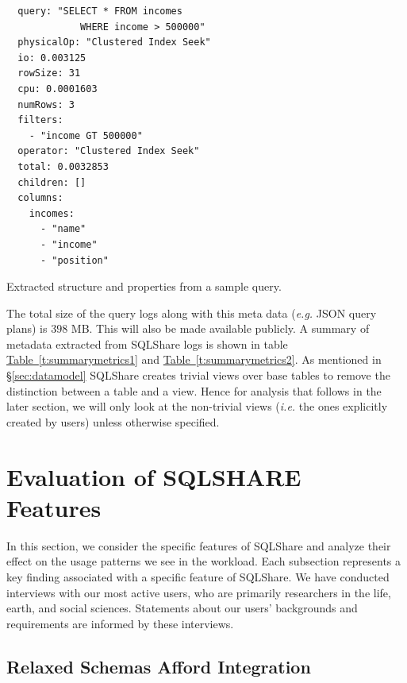 \documentclass{sig-alternate}
\newcommand{\note}[2]{{\color{#1} {#2}}}
\newcommand{\reviewmeta}[1]{\note{black}{#1}}
\newcommand{\ie}{{\em i.e.}\xspace}
\newcommand{\eg}{{\em e.g.}\xspace}
\newcommand{\secref}[1]{\hyperref[#1]{\S\ref*{#1}}}
\newcommand{\tabref}[1]{\hyperref[#1]{Table~\ref*{#1}}}
\newcommand{\sqlshare}{SQLShare}
\newcommand{\SQLSHARE}{SQLSHARE}
\begin{document}
\begin{listing}[h]
\begin{verbatim}
  query: "SELECT * FROM incomes
             WHERE income > 500000"
  physicalOp: "Clustered Index Seek"
  io: 0.003125
  rowSize: 31
  cpu: 0.0001603
  numRows: 3
  filters:
    - "income GT 500000"
  operator: "Clustered Index Seek"
  total: 0.0032853
  children: []
  columns:
    incomes:
      - "name"
      - "income"
      - "position"
\end{verbatim}
\caption{Extracted structure and properties from a sample query.}
\label{lst:plan}
\end{listing}


The total size of the query logs along with this meta data (\eg JSON query plans) is $398$ MB. This will also be made available publicly.
A summary of metadata extracted from \sqlshare{} logs is shown in table \tabref{t:summarymetrics1} and \tabref{t:summarymetrics2}.
As mentioned in \secref{sec:datamodel}  \sqlshare{} creates trivial views over base tables to remove the distinction between a table and a view. 
Hence for analysis that follows in the later section, we will only look at the non-trivial views (\ie the ones explicitly created by users) unless otherwise specified.

\section{Evaluation of \SQLSHARE{}\\Features}
\label{sec:features}

In this section, we consider the specific features of \sqlshare{} and analyze their effect on the usage patterns we see in the workload.
Each subsection represents a key finding associated with a specific feature of \sqlshare{}.
\reviewmeta{We have conducted interviews with our most active users, who are primarily researchers in the life, earth, and social sciences.  Statements about our users' backgrounds and requirements are informed by these interviews.}

\subsection{Relaxed Schemas Afford Integration}
\label{sec:relaxedschema}
\end{document}
